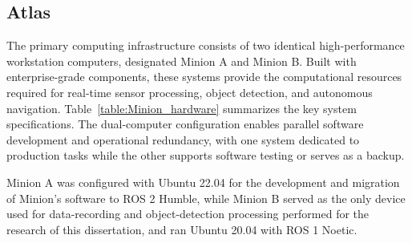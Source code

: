\documentclass{erauthesis}
\begin{document}




\subsection{Atlas} \label{atlas}

The primary computing infrastructure consists of two identical high-performance workstation computers, designated Minion A and Minion B.  
Built with enterprise-grade components, these systems provide the computational resources required for real-time sensor processing, object detection, and autonomous navigation.
Table~\ref{table:Minion_hardware} summarizes the key system specifications.
The dual-computer configuration enables parallel software development and operational redundancy, with one system dedicated to production tasks while the other supports software testing or serves as a backup.
 
Minion A was configured with Ubuntu 22.04 for the development and migration of Minion's software to ROS 2 Humble, while 
Minion B served as the only device used for data-recording and object-detection processing performed for the research of this dissertation, and ran Ubuntu 20.04 with ROS 1 Noetic.

\end{document}
